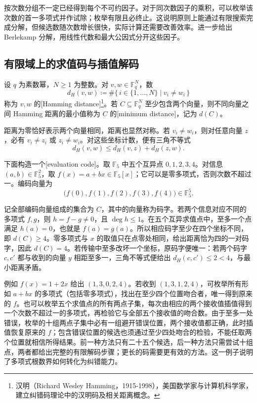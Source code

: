 \ProseParagraphBreak
按次数分组不一定已经得到每个不可约因子。对于同次数因子的乘积，可以枚举该次数的首一多项式并作试除；枚举有限且必终止。这说明原则上能通过有限搜索完成分解，但候选数随次数增长很快，实际计算还需要改善效率。进一步给出 Berlekamp 分解，用线性代数和最大公因式分开这些因子。

\subsection{有限域上的求值码与插值解码}
\label{b1:subsec:1704:03}

\begin{definition}\label{b1:def:hamming-distance}
	设 \(q\) 为素数幂，\(N\geq1\) 为整数。对 \(v,w\in\mathbb F_q^N\)，数
	\[
		d_H(v,w)\coloneqq\#\{\,i\in\{1,\ldots,N\}\mid v_i\ne w_i\,\}
	\]
	称为 \(v,w\) 的[Hamming distance]\footnote{汉明（Richard Wesley Hamming，1915-1998），美国数学家与计算机科学家，建立纠错码理论中的汉明码及相关距离概念。}。若 \(C\subseteq\mathbb F_q^N\) 至少包含两个向量，则不同向量之间 Hamming 距离的最小值称为 \(C\) 的[minimum distance]，记为 \(d(C)\)。
\end{definition}
距离为零恰好表示两个向量相同，距离也显然对称。若 \(v_i\ne w_i\)，则对任意向量 \(z\)，必有 \(v_i\ne z_i\) 或 \(z_i\ne w_i\)。对这些坐标计数，便有三角不等式
\[
	d_H(v,w)\leq d_H(v,z)+d_H(z,w).
\]

\begin{samepage}
	下面构造一个[evaluation code]。取 \(\mathbb F_5\) 中五个互异点 \(0,1,2,3,4\)。对信息 \((a,b)\in\mathbb F_5^2\)，取 \(f(x)=a+bx\in\mathbb F_5[x]\)；它可以是零多项式，否则次数不超过一。编码向量为
	\[
		\bigl(f(0),f(1),f(2),f(3),f(4)\bigr)\in\mathbb F_5^5.
	\]
\end{samepage}
记全部编码向量组成的集合为 \(C\)，其中的向量称为码字。若两个信息对应不同的多项式 \(f,g\)，则 \(h=f-g\ne0\)，且 \(\deg h\leq1\)。在五个互异求值点中，至多一个点满足 \(h(a)=0\)，也就是 \(f(a)=g(a)\)。所以相应码字至少在四个坐标不同，即 \(d(C)\geq4\)。零多项式与 \(x\) 的取值只在点零处相同，给出距离恰为四的一对码字，因此 \(d(C)=4\)。若传输中至多改坏一个坐标，原码字便唯一：若两个码字 \(c,c'\) 都与收到的向量 \(y\) 相距至多一，三角不等式便给出 \(d_H(c,c')\leq2<4\)，与最小距离矛盾。

\ProseParagraphBreak
例如 \(f(x)=1+2x\) 给出 \((1,3,0,2,4)\)。若收到 \((1,3,1,2,4)\)，可枚举所有形如 \(a+bx\) 的多项式（包括零多项式），找出在至少四个位置吻合者，唯一得到原来的 \(f\)。也可以枚举五个求值点的所有两点子集，每次由相应的两个接收值插值得到一个次数不超过一的多项式，再检验它与全部五个接收值的吻合数。由于至多一处错误，枚举的十组两点子集中必有一组避开错误位置，两个接收值都正确，此时插值恢复原来的 \(f\)；包含错误位置的候选也须通过至少四处吻合的检验，不能任取两个位置就相信所得结果。前一种方法只有二十五个候选，后一种方法只需尝试十组点，两者都给出完整的有限解码步骤；更长的码需要更有效的方法。这一例子说明了多项式根数界如何转化为纠错能力。
